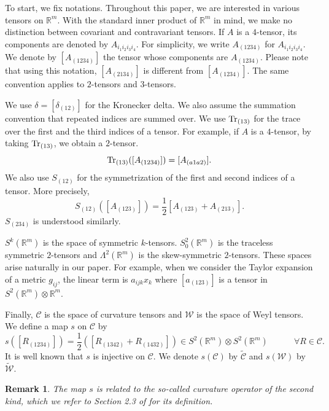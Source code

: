 \documentclass{amsart}
\newtheorem{rem}[thm]{Remark}
\newcommand{\Real}{\mathbb R}
\numberwithin{equation}{section}
\begin{document}
To start, we fix notations. Throughout this paper, we are interested in various tensors on $\Real^m$. With the standard inner product of $\Real^m$ in mind, we make no distinction between covariant and contravariant tensors. If $A$ is a $4$-tensor, its components are denoted by $A_{i_1i_2i_3i_4}$. For simplicity, we write $A_{(1234)}$ for $A_{i_1i_2i_3i_4}$. We denote by $[A_{(1234)}]$ the tensor whose components are $A_{(1234)}$. Please note that using this notation, $[A_{(2134)}]$ is different from $[A_{(1234)}]$. The same convention applies to $2$-tensors and $3$-tensors.

We use $\delta=[\delta_{(12)}]$ for the Kronecker delta. We also assume the summation convention that repeated indices are summed over. We use ${\rm Tr}_{(13)}$ for the trace over the first and the third indices of a tensor. For example, if $A$ is a $4$-tensor, by taking ${\rm Tr}_{(13)}$, we obtain a $2$-tensor.
\[
	{\rm Tr}_{(13)}([A_{(1234)}])=[A_{(a1a2)}].
\]
We also use $S_{(12)}$ for the symmetrization of the first and second indices of a tensor. More precisely,
\[
	S_{(12)}([A_{(123)}])= \frac{1}{2}[A_{(123)}+A_{(213)}].
\]
$S_{(234)}$ is understood similarly.


$S^k(\Real^m)$ is the space of symmetric $k$-tensors. $S^2_0(\Real^m)$ is the traceless symmetric $2$-tensors and $\Lambda^2(\Real^m)$ is the skew-symmetric $2$-tensors. These spaces arise naturally in our paper. For example, when we consider the Taylor expansion of a metric $g_{ij}$, the linear term is $a_{ijk}x_k$ where $[a_{(123)}]$ is a tensor in $S^2(\Real^m)\otimes \Real^m$. 

Finally, $\mathcal C$ is the space of curvature tensors and $\mathcal W$ is the space of Weyl tensors. We define a map $s$ on $\mathcal C$ by
\[
	s([R_{(1234)}])=\frac{1}{2} ([R_{(1342)}+ R_{(1432)}])\in S^2(\Real^m)\otimes S^2(\Real^m) \qquad \text{} \quad \forall R\in \mathcal C.
\]
It is well known that $s$ is injective on $\mathcal C$. We denote $s(\mathcal C)$ by $\widetilde{\mathcal C}$ and $s(\mathcal W)$ by $\widetilde{\mathcal W}$.%

\begin{rem}
	The map $s$ is related to the so-called curvature operator of the second kind, which we refer to Section 2.3 of \cite{bourguignon1978} for its definition. %
\end{rem}
\end{document}
